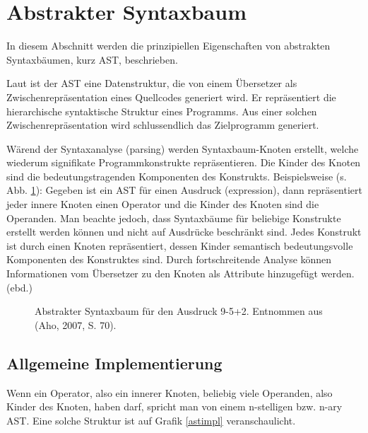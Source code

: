  
\section{Abstrakter Syntaxbaum}\label{ast-sec}
 
In diesem Abschnitt werden die prinzipiellen Eigenschaften von abstrakten Syntaxbäumen, kurz AST, beschrieben.

 
Laut \citep{Aho} ist der AST eine Datenstruktur, die von einem Übersetzer als Zwischenrepräsentation eines Quellcodes generiert wird. Er repräsentiert die hierarchische syntaktische Struktur eines Programms. Aus einer solchen Zwischenrepräsentation wird schlussendlich das Zielprogramm generiert.

 
Wärend der Syntaxanalyse (parsing) werden Syntaxbaum-Knoten erstellt, welche wiederum signifikate Programmkonstrukte repräsentieren. Die Kinder des Knoten sind die bedeutungstragenden Komponenten des Konstrukts. Beispielsweise (s. Abb. \ref{ast}): Gegeben ist ein AST für einen Ausdruck (expression), dann repräsentiert jeder innere Knoten einen Operator und die Kinder des Knoten sind die Operanden. Man beachte jedoch, dass Syntaxbäume für beliebige Konstrukte erstellt werden können und nicht auf Ausdrücke beschränkt sind. Jedes Konstrukt ist durch einen Knoten repräsentiert, dessen Kinder semantisch bedeutungsvolle Komponenten des Konstruktes sind. Durch fortschreitende Analyse können Informationen vom Übersetzer zu den Knoten als Attribute hinzugefügt werden. (ebd.)

 
\begin{figure}[h!]
\centering
\advance\leftskip-2.5cm
\caption[Abstrakter Syntaxbaum Beispiel]{ Abstrakter Syntaxbaum für den Ausdruck 9-5+2. Entnommen aus (Aho, 2007, S. 70). }\label{ast}
\end{figure}
 
\subsection{Allgemeine Implementierung}\label{}
 
Wenn ein Operator, also ein innerer Knoten, beliebig viele Operanden, also Kinder des Knoten, haben darf, spricht man von einem n-stelligen bzw. n-ary AST. \citep{Edwards} Eine solche Struktur ist auf Grafik \ref{astimpl} veranschaulicht.

